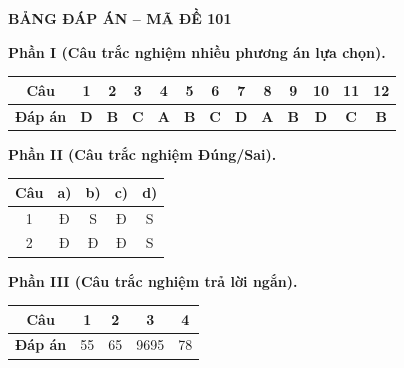 \vspace{0.4cm}
\noindent\begin{minipage}{\linewidth}
\begin{center}{\large\bfseries\color{red!80!black} BẢNG ĐÁP ÁN -- MÃ ĐỀ 101}\end{center}
\vspace{0.15cm}
\noindent\textbf{Phần I (Câu trắc nghiệm nhiều phương án lựa chọn).}\par\smallskip
\begin{center}
\begin{tabular}{|c|c|c|c|c|c|c|c|c|c|c|c|c|}\hline
\textbf{Câu} & 1 & 2 & 3 & 4 & 5 & 6 & 7 & 8 & 9 & 10 & 11 & 12 \\ \hline
\textbf{Đáp án} & \textbf{D} & \textbf{B} & \textbf{C} & \textbf{A} & \textbf{B} & \textbf{C} & \textbf{D} & \textbf{A} & \textbf{B} & \textbf{D} & \textbf{C} & \textbf{B} \\ \hline
\end{tabular}
\end{center}
\noindent\textbf{Phần II (Câu trắc nghiệm Đúng/Sai).}\par\smallskip
\begin{center}
\begin{tabular}{|c|c|c|c|c|}\hline
\textbf{Câu} & \textbf{a)} & \textbf{b)} & \textbf{c)} & \textbf{d)} \\ \hline
1 & Đ & S & Đ & S \\ \hline
2 & Đ & Đ & Đ & S \\ \hline
\end{tabular}
\end{center}
\noindent\textbf{Phần III (Câu trắc nghiệm trả lời ngắn).}\par\smallskip
\begin{center}
\begin{tabular}{|c|c|c|c|c|}\hline
\textbf{Câu} & 1 & 2 & 3 & 4 \\ \hline
\textbf{Đáp án} & 55 & 65 & 9695 & 78 \\ \hline
\end{tabular}
\end{center}
\end{minipage}
